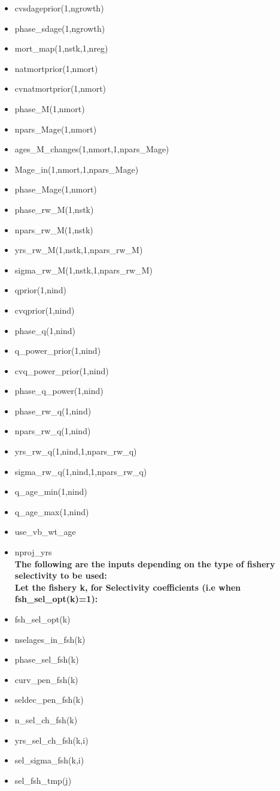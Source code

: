 \documentclass{article}
\begin{document}
\begin{itemize}
    \item cvsdageprior(1,ngrowth)
    \item phase\_sdage(1,ngrowth)
    \item mort\_map(1,nstk,1,nreg)
    \item natmortprior(1,nmort)
    \item cvnatmortprior(1,nmort)
    \item phase\_M(1,nmort)
    \item npars\_Mage(1,nmort)
    \item ages\_M\_changes(1,nmort,1,npars\_Mage)
    \item Mage\_in(1,nmort,1,npars\_Mage)
    \item phase\_Mage(1,nmort)
    \item phase\_rw\_M(1,nstk)
    \item npars\_rw\_M(1,nstk)
    \item yrs\_rw\_M(1,nstk,1,npars\_rw\_M)
    \item sigma\_rw\_M(1,nstk,1,npars\_rw\_M)
    \item qprior(1,nind)
    \item cvqprior(1,nind)  
    \item phase\_q(1,nind)
    \item q\_power\_prior(1,nind)
    \item cvq\_power\_prior(1,nind) 
    \item phase\_q\_power(1,nind)
    \item phase\_rw\_q(1,nind)
    \item npars\_rw\_q(1,nind)
    \item yrs\_rw\_q(1,nind,1,npars\_rw\_q)
    \item sigma\_rw\_q(1,nind,1,npars\_rw\_q)
    \item q\_age\_min(1,nind)
    \item q\_age\_max(1,nind) 
    \item use\_vb\_wt\_age 
    \item nproj\_yrs\\
    
    \textbf{The following are the inputs depending on the type of fishery selectivity to be used:}\\
    
    \textbf{Let the fishery k, for Selectivity coefficients (i.e when fsh\_sel\_opt(k)=1):}\\
    
    \item fsh\_sel\_opt(k)
    \item nselages\_in\_fsh(k)
    \item phase\_sel\_fsh(k)
    \item curv\_pen\_fsh(k)
    \item seldec\_pen\_fsh(k) 
    \item n\_sel\_ch\_fsh(k)
    \item yrs\_sel\_ch\_fsh(k,i)
    \item sel\_sigma\_fsh(k,i)
    \item sel\_fsh\_tmp(j)\\
    

\end{itemize}
\end{document}
